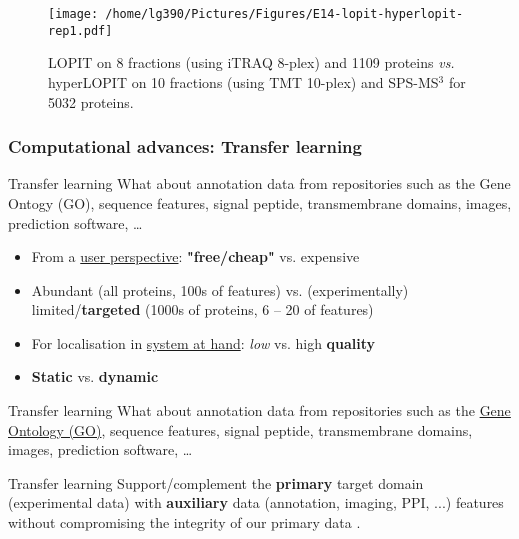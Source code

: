 \begin{frame}
  \begin{figure}[h]
    \centering
    \texttt{[image: /home/lg390/Pictures/Figures/E14-lopit-hyperlopit-rep1.pdf]}
    \caption{LOPIT on 8 fractions (using iTRAQ 8-plex) and 1109
      proteins \textit{vs.}  hyperLOPIT on 10 fractions (using TMT
      10-plex) and SPS-MS$^3$ for 5032 proteins.}
  \end{figure}

\end{frame}

\subsubsection{Computational advances: Transfer learning}

\begin{frame}{Transfer learning}
  What about annotation data from repositories such as the Gene Ontogy
  (GO), sequence features, signal peptide, transmembrane domains,
  images, prediction software, \ldots

  \begin{block}{}
    \begin{itemize}
    \item From a \underline{user perspective}: \textbf{"free/cheap"}
      vs. expensive
    \item Abundant (all proteins, 100s of features) vs. (experimentally)
      limited/\textbf{targeted} (1000s of proteins, 6 -- 20 of features)
    \item For localisation in \underline{system at hand}: \textit{low}
      vs. high \textbf{quality}
    \item \textbf{Static} vs. \textbf{dynamic}
    \end{itemize}
  \end{block}

\end{frame}

\begin{frame}{Transfer learning}
  What about annotation data from repositories such as the
  \underline{Gene Ontology (GO)}, sequence features, signal peptide,
  transmembrane domains, images, prediction software, \ldots

  \begin{block}{Transfer learning}
    Support/complement the \textbf{primary} target domain
    (experimental data) with \textbf{auxiliary} data (annotation,
    imaging, PPI, ...)  features without compromising the integrity of
    our primary data \citep{Breckels:2016}.
  \end{block}

\end{frame}


